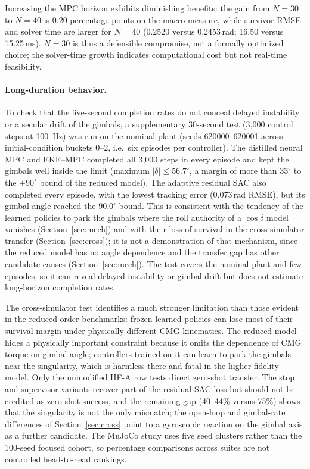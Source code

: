 \documentclass[preprint,12pt,authoryear=false]{elsarticle}
\theoremstyle{remark}\newtheorem{remark}{Remark}
\theoremstyle{plain}\newtheorem{proposition}{Proposition}\newtheorem{lemma}{Lemma}
\theoremstyle{definition}\newtheorem{assumption}{Assumption}
\begin{document}
Increasing the MPC horizon exhibits diminishing benefits: the gain from $N=30$ to $N=40$ is 0.20 percentage points on the macro measure, while survivor RMSE and solver time are larger for $N=40$ (0.2520 versus 0.2453\,rad; 16.50 versus 15.25\,ms). $N=30$ is thus a defensible compromise, not a formally optimized choice; the solver-time growth indicates computational cost but not real-time feasibility.

\paragraph{Long-duration behavior.}\label{sec:long}
To check that the five-second completion rates do not conceal delayed instability or a secular drift of the gimbals, a supplementary 30-second test (3{,}000 control steps at \SI{100}{\hertz}) was run on the nominal plant (seeds 620000--620001 across initial-condition buckets 0--2, i.e.\ six episodes per controller). The distilled neural MPC and EKF--MPC completed all 3{,}000 steps in every episode and kept the gimbals well inside the limit (maximum $|\delta|\le56.7^\circ$, a margin of more than $33^\circ$ to the $\pm90^\circ$ bound of the reduced model). The adaptive residual SAC also completed every episode, with the lowest tracking error (0.073\,rad RMSE), but its gimbal angle reached the $90.0^\circ$ bound. This is consistent with the tendency of the learned policies to park the gimbals where the roll authority of a $\cos\delta$ model vanishes (Section~\ref{sec:mech}) and with their loss of survival in the cross-simulator transfer (Section~\ref{sec:cross}); it is not a demonstration of that mechanism, since the reduced model has no angle dependence and the transfer gap has other candidate causes (Section~\ref{sec:mech}). The test covers the nominal plant and few episodes, so it can reveal delayed instability or gimbal drift but does not estimate long-horizon completion rates.

The cross-simulator test identifies a much stronger limitation than those evident in the reduced-order benchmarks: frozen learned policies can lose most of their survival margin under physically different CMG kinematics. The reduced model hides a physically important constraint because it omits the dependence of CMG torque on gimbal angle; controllers trained on it can learn to park the gimbals near the singularity, which is harmless there and fatal in the higher-fidelity model. Only the unmodified HF-A row tests direct zero-shot transfer. The stop and supervisor variants recover part of the residual-SAC loss but should not be credited as zero-shot success, and the remaining gap (40--44\% versus 75\%) shows that the singularity is not the only mismatch; the open-loop and gimbal-rate differences of Section~\ref{sec:cross} point to a gyroscopic reaction on the gimbal axis as a further candidate. The MuJoCo study uses five seed clusters rather than the 100-seed focused cohort, so percentage comparisons across suites are not controlled head-to-head rankings.
\end{document}
